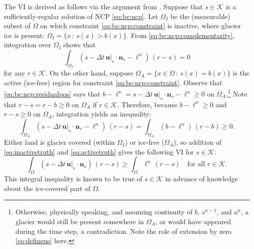 \documentclass[hidelinks,onefignum,onetabnum,final]{siamart220329}  %
\newcommand{\bn}{\mathbf{n}}
\newcommand{\bu}{\mathbf{u}}
\newcommand{\cK}{\mathcal{K}}
\begin{document}
The VI is derived as follows via the argument from \cite{Bueler2021conservation}.  Suppose that $s \in \cK$ is a sufficiently-regular solution of NCP \eqref{eq:be:ncp}.  Let $\Omega_I$ be the (measurable) subset of $\Omega$ on which constraint \eqref{eq:be:ncp:constraint} is inactive, where glacier ice is present: $\Omega_I = \{x\,:\,s(x)>b(x)\}$.  From \eqref{eq:be:ncp:complementarity}, integration over $\Omega_I$ shows that
\begin{equation}
\int_{\Omega_I} \left(s - \Delta t\,\bu|_s \cdot \bn_s - \ell^n\right)\,(r-s) = 0  \label{eq:inactivetruth}
\end{equation}
for any $r\in\cK$.  On the other hand, suppose $\Omega_A = \{x \in \Omega \,:\,s(x)=b(x)\}$ is the active (ice-free) region for constraint \eqref{eq:be:ncp:constraint}.  Observe that \eqref{eq:be:ncp:residualpos} says that $b-\ell^n = s - \Delta t\,\bu|_s \cdot \bn_s - \ell^n \ge 0$ on $\Omega_A$.\footnote{Otherwise, physically speaking, and assuming continuity of $b$, $s^{n-1}$, and $a^n$, a glacier would still be present somewhere in $\Omega_A$, or would have appeared during the time step, a contradiction.  Note the role of extension by zero \eqref{eq:defineus} here.}  Note that $r-s=r-b\ge 0$ on $\Omega_A$ if $r\in\cK$.  Therefore, because $b-\ell^n \ge 0$ and $r-s\ge 0$ on $\Omega_A$, integration yields an inequality:
\begin{equation}
\int_{\Omega_A} \left(s - \Delta t\,\bu|_s \cdot \bn_s - \ell^n\right)\,(r-s) = \int_{\Omega_A} \left(b - \ell^n\right)\,(r-b) \ge 0.  \label{eq:activetruth}
\end{equation}
Either land is glacier covered (within $\Omega_I$) or ice-free ($\Omega_A$), so addition of \eqref{eq:inactivetruth} and \eqref{eq:activetruth} gives the following VI for $s \in \cK$:
\begin{equation}
\int_\Omega \left(s - \Delta t\,\bu|_s \cdot \bn_s\right)\,(r-s) \ge \int_\Omega \ell^n \,(r-s) \quad \text{for all } r \in \cK. \label{eq:be:viearly}
\end{equation}
This integral inequality is known to be true of $s\in\cK$ in advance of knowledge about the ice-covered part of $\Omega$.
	
\end{document}
